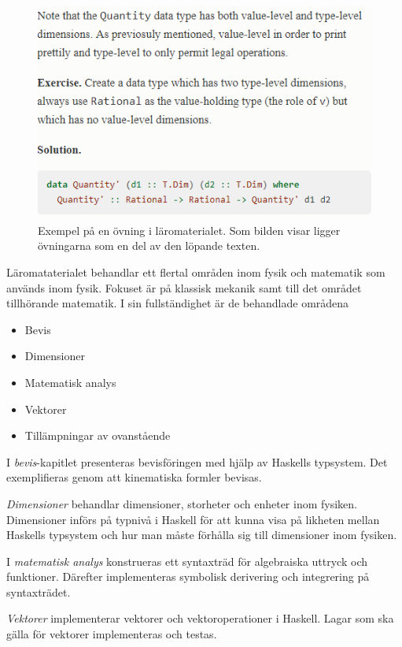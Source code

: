 \begin{binge}
\begin{figure}[tph]
  \includegraphics[width=\linewidth]{figure/smakprov_ovning.png}
  \caption{Exempel på en övning i läromaterialet. Som bilden visar ligger övningarna som en del av den löpande texten.}
  \label{fig:smakprov_ovning}
\end{figure}

Läromataterialet behandlar ett flertal områden inom fysik och matematik som används inom fysik. Fokuset är på klassisk mekanik samt till det området tillhörande matematik. I sin fullständighet är de behandlade områdena

\begin{itemize}
  \item Bevis
  \item Dimensioner
  \item Matematisk analys
  \item Vektorer
  \item Tillämpningar av ovanstående
\end{itemize}

I \textit{bevis}-kapitlet presenteras bevisföringen med hjälp av Haskells typsystem. Det exemplifieras genom att kinematiska formler bevisas.

\textit{Dimensioner} behandlar dimensioner, storheter och enheter inom fysiken. Dimensioner införs på typnivå i Haskell för att kunna visa på likheten mellan Haskells typsystem och hur man måste förhålla sig till dimensioner inom fysiken.

I \textit{matematisk analys} konstrueras ett syntaxträd för algebraiska uttryck och funktioner. Därefter implementeras symbolisk derivering och integrering på syntaxträdet.

\textit{Vektorer} implementerar vektorer och vektoroperationer i Haskell. Lagar som ska gälla för vektorer implementeras och testas.


\end{binge}
